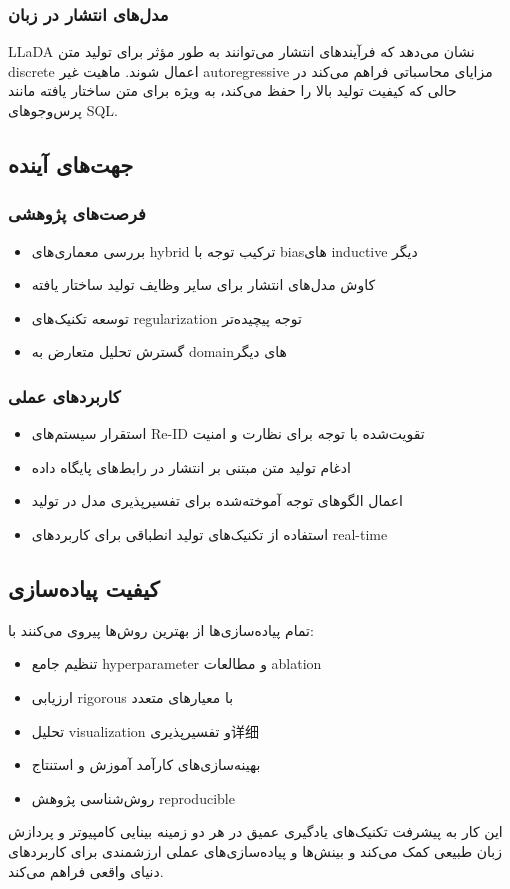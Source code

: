 \documentclass[12pt,a4paper]{article}
\theoremstyle{definition}
\begin{document}
\subsubsection*{مدل‌های انتشار در زبان}
LLaDA نشان می‌دهد که فرآیندهای انتشار می‌توانند به طور مؤثر برای تولید متن discrete اعمال شوند. ماهیت غیر autoregressive مزایای محاسباتی فراهم می‌کند در حالی که کیفیت تولید بالا را حفظ می‌کند، به ویژه برای متن ساختار یافته مانند پرس‌وجوهای SQL.

\subsection{جهت‌های آینده}

\subsubsection*{فرصت‌های پژوهشی}
\begin{itemize}
    \item بررسی معماری‌های hybrid ترکیب توجه با biasهای inductive دیگر
    \item کاوش مدل‌های انتشار برای سایر وظایف تولید ساختار یافته
    \item توسعه تکنیک‌های regularization توجه پیچیده‌تر
    \item گسترش تحلیل متعارض به domainهای دیگر
\end{itemize}

\subsubsection*{کاربردهای عملی}
\begin{itemize}
    \item استقرار سیستم‌های Re-ID تقویت‌شده با توجه برای نظارت و امنیت
    \item ادغام تولید متن مبتنی بر انتشار در رابط‌های پایگاه داده
    \item اعمال الگوهای توجه آموخته‌شده برای تفسیرپذیری مدل در تولید
    \item استفاده از تکنیک‌های تولید انطباقی برای کاربردهای real-time
\end{itemize}

\subsection{کیفیت پیاده‌سازی}
تمام پیاده‌سازی‌ها از بهترین روش‌ها پیروی می‌کنند با:
\begin{itemize}
    \item تنظیم جامع hyperparameter و مطالعات ablation
    \item ارزیابی rigorous با معیارهای متعدد
    \item تحلیل visualization و تفسیرپذیری详细
    \item بهینه‌سازی‌های کارآمد آموزش و استنتاج
    \item روش‌شناسی پژوهش reproducible
\end{itemize}

این کار به پیشرفت تکنیک‌های یادگیری عمیق در هر دو زمینه بینایی کامپیوتر و پردازش زبان طبیعی کمک می‌کند و بینش‌ها و پیاده‌سازی‌های عملی ارزشمندی برای کاربردهای دنیای واقعی فراهم می‌کند.
\end{document}
